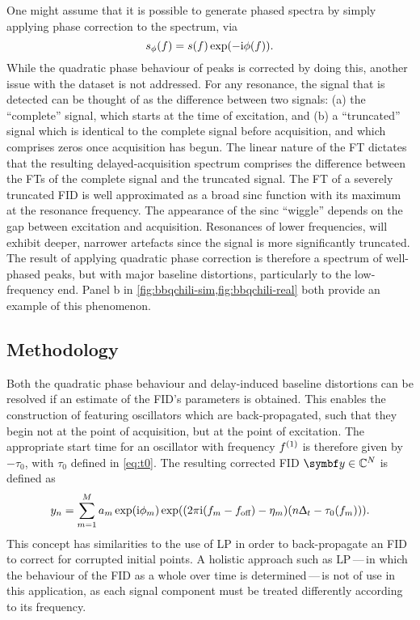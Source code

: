 One might assume that it is possible to generate phased spectra by simply
applying phase correction to the spectrum, via
\begin{equation}
    s_{\phi}(f) = s(f) \exp(-\mathrm{i} \phi(f)).
        \label{eq:spec-phase-chili}
\end{equation}
While the quadratic phase behaviour of peaks is corrected by doing this,
another issue with the dataset is not addressed.
For any resonance, the signal that is detected can be thought of as
the difference between two signals: (a) the ``complete'' signal, which starts
at the time of excitation, and (b) a ``truncated'' signal which is identical to
the complete signal before acquisition, and which comprises zeros once
acquisition has begun. The linear nature of the \ac{FT} dictates that the
resulting delayed-acquisition spectrum comprises the difference between the
\acp{FT} of the complete signal and the truncated signal.  The \ac{FT} of a
severely
truncated \ac{FID} is well approximated as a broad sinc function with its maximum
at the resonance frequency. The appearance of the sinc ``wiggle'' depends on
the gap between excitation and acquisition. Resonances of lower
frequencies, will exhibit deeper, narrower artefacts since the signal is more
significantly truncated. The result of applying quadratic phase correction is
therefore a spectrum of well-phased peaks, but with major baseline distortions,
particularly to the low-frequency end. Panel b in
\cref{fig:bbqchili-sim,fig:bbqchili-real} both provide an example of this
phenomenon.

\subsection{Methodology}
Both the quadratic phase behaviour and delay-induced baseline distortions can
be resolved if an estimate of the \ac{FID}'s parameters is obtained. This enables
the construction of  featuring oscillators which are back-propagated,
such that they begin not at the point of acquisition, but at the point of
excitation. The appropriate start time for an oscillator with frequency $f^{(1)}$
is therefore given by $-\tau_0$, with $\tau_0$ defined in \cref{eq:t0}. The
resulting corrected \ac{FID} $\by \in \mathbb{C}^N$ is defined as
\begin{equation}
    y_n = \sum_{m=1}^{M} a_m \exp(\mathrm{i} \phi_m) \exp((2 \pi \mathrm{i} (f_m - f_{\text{off}}) - \eta_m) (n \Updelta_t - \tau_0(f_m))).
    \label{eq:backprop}
\end{equation}
This concept has similarities to the use of \ac{LP} in order to back-propagate
an \ac{FID} to correct for corrupted initial points. A holistic approach such
as \ac{LP}\,---\,in which the behaviour of the \ac{FID} as a whole over time is
determined\,---\,is not of use in this application, as each signal component
must be treated differently according to its frequency.

